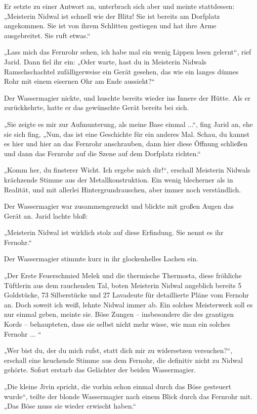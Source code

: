 Er setzte zu einer Antwort an, unterbrach sich aber und meinte stattdessen: „Meisterin Nidwal ist schnell wie der Blitz! Sie ist bereits am Dorfplatz angekommen. Sie ist von ihrem Schlitten gestiegen und hat ihre Arme ausgebreitet. Sie ruft etwas.“

„Lass mich das Fernrohr sehen, ich habe mal ein wenig Lippen lesen gelernt“, rief Jarid. Dann fiel ihr ein: „Oder warte, hast du in Meisterin Nidwals Ramschschachtel zufälligerweise ein Gerät gesehen, das wie ein langes dünnes Rohr mit einem eisernen Ohr am Ende aussieht?“

Der Wassermagier nickte, und huschte bereits wieder ins Innere der Hütte. Als er zurückkehrte, hatte er das gewünschte Gerät bereits bei sich.

„Sie zeigte es mir zur Aufmunterung, als meine Base einmal ...“, fing Jarid an, ehe sie sich fing, „Nun, das ist eine Geschichte für ein anderes Mal. Schau, du kannst es hier und hier an das Fernrohr anschrauben, dann hier diese Öffnung schließen und dann das Fernrohr auf die Szene auf dem Dorfplatz richten.“

„Komm her, du finsterer Wicht. Ich ergebe mich dir!“, erschall Meisterin Nidwals krächzende Stimme aus der Metallkonstruktion. Ein wenig blecherner als in Realität, und mit allerlei Hintergrundrauschen, aber immer noch verständlich.

Der Wassermagier war zusammengezuckt und blickte mit großen Augen das Gerät an. Jarid lachte bloß:

„Meisterin Nidwal ist wirklich stolz auf diese Erfindung. Sie nennt es ihr Fernohr.“

Der Wassermagier stimmte kurz in ihr glockenhelles Lachen ein.

„Der Erste Feuerschmied Melek und die thermische Thermosta, diese fröhliche Tüftlerin aus dem rauchenden Tal, boten Meisterin Nidwal angeblich bereits 5 Goldstücke, 73 Silberstücke und 27 Lavadeute für detaillierte Pläne vom Fernohr an. Doch soweit ich weiß, lehnte Nidwal immer ab. Ein solches Meisterwerk soll es nur einmal geben, meinte sie. Böse Zungen – insbesondere die des grantigen Kords – behaupteten, dass sie selbst nicht mehr wisse, wie man ein solches Fernohr ... “

„Wer bist du, der du mich rufst, statt dich mir zu widersetzen versuchen?“, erschall eine keuchende Stimme aus dem Fernohr, die definitiv nicht zu Nidwal gehörte. Sofort erstarb das Gelächter der beiden Wassermagier.

„Die kleine Jivin spricht, die vorhin schon einmal durch das Böse gesteuert wurde“, teilte der blonde Wassermagier nach einem Blick durch das Fernrohr mit. „Das Böse muss sie wieder erwischt haben.“

